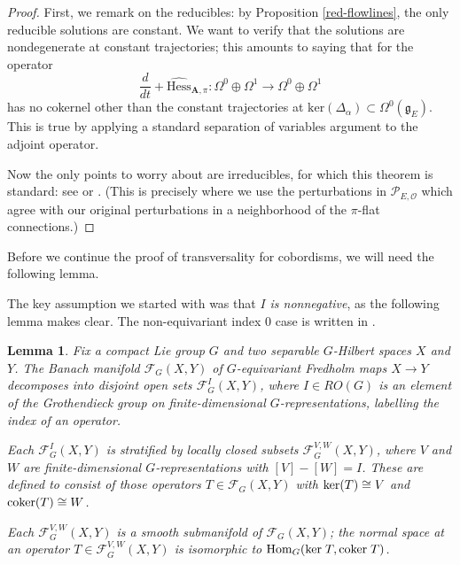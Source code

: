 \documentclass[10pt,a4paper]{amsart}
\newtheorem{lemma}[theorem]{Lemma}
\theoremstyle{definition}
\theoremstyle{remark}
\numberwithin{figure}{qchap}
\begin{document}
\begin{proof}First, we remark on the reducibles: by Proposition \ref{red-flowlines}, the only reducible solutions are constant. We want to verify that the solutions are nondegenerate at constant trajectories; this amounts to saying that for the operator $$\frac{d}{dt} + \widehat{\text{Hess}}_{\mathbf{A},\pi}: \Omega^0 \oplus \Omega^1 \to \Omega^0 \oplus \Omega^1$$ has no cokernel other than the constant trajectories at $\text{ker}(\Delta_\alpha) \subset \Omega^0(\mathfrak g_E)$. This is true by applying a standard separation of variables argument to the adjoint operator.

Now the only points to worry about are irreducibles, for which this theorem is standard: see \cite[Section~5.5.1]{Don} or \cite{KM1}. (This is precisely where we use the perturbations in $\mathcal P_{E, \mathcal O}$ which agree with our original perturbations in a neighborhood of the $\pi$-flat connections.)
\end{proof}

Before we continue the proof of transversality for cobordisms, we will need the following lemma.

The key assumption we started with was that \emph{$I$ is nonnegative}, as the following lemma makes clear. The non-equivariant index $0$ case is written in \cite[Appendix~A.3]{Salamon}.

\begin{lemma}\label{CokernelManifold}Fix a compact Lie group $G$ and two separable $G$-Hilbert spaces $X$ and $Y$. The Banach manifold $\mathcal F_G(X, Y)$ of $G$-equivariant Fredholm maps $X \to Y$ decomposes into disjoint open sets $\mathcal F_G^I(X, Y)$, where $I \in RO(G)$ is an element of the Grothendieck group on finite-dimensional $G$-representations, labelling the index of an operator.

Each $\mathcal F^I_G(X, Y)$ is stratified by locally closed subsets $\mathcal F^{V,W}_G(X, Y)$, where $V$ and $W$ are finite-dimensional $G$-representations with $[V] - [W] = I$. These are defined to consist of those operators $T \in \mathcal F_G(X, Y)$ with $\textup{ker}(T) \cong V$ and $\textup{coker}(T) \cong W$.

Each $\mathcal F^{V, W}_G(X, Y)$ is a smooth submanifold of $\mathcal F_G(X,Y)$; the normal space at an operator $T \in \mathcal F^{V, W}_G(X, Y)$ is isomorphic to $\textup{Hom}_G(\textup{ker} \;T, \textup{coker} \;T)$.
\end{lemma}
\end{document}
